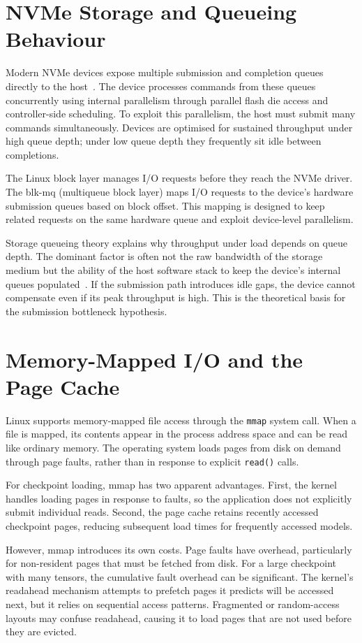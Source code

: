 \section{NVMe Storage and Queueing Behaviour}

Modern NVMe devices expose multiple submission and completion queues directly to the host~\cite{NVME_SPEC}. The device processes commands from these queues concurrently using internal parallelism through parallel flash die access and controller-side scheduling. To exploit this parallelism, the host must submit many commands simultaneously. Devices are optimised for sustained throughput under high queue depth; under low queue depth they frequently sit idle between completions.

The Linux block layer manages I/O requests before they reach the NVMe driver. The blk-mq (multiqueue block layer) maps I/O requests to the device's hardware submission queues based on block offset. This mapping is designed to keep related requests on the same hardware queue and exploit device-level parallelism.

Storage queueing theory explains why throughput under load depends on queue depth. The dominant factor is often not the raw bandwidth of the storage medium but the ability of the host software stack to keep the device's internal queues populated~\cite{STORAGE_QUEUEING}. If the submission path introduces idle gaps, the device cannot compensate even if its peak throughput is high. This is the theoretical basis for the submission bottleneck hypothesis.

\section{Memory-Mapped I/O and the Page Cache}

Linux supports memory-mapped file access through the \texttt{mmap} system call. When a file is mapped, its contents appear in the process address space and can be read like ordinary memory. The operating system loads pages from disk on demand through page faults, rather than in response to explicit \texttt{read()} calls.

For checkpoint loading, mmap has two apparent advantages. First, the kernel handles loading pages in response to faults, so the application does not explicitly submit individual reads. Second, the page cache retains recently accessed checkpoint pages, reducing subsequent load times for frequently accessed models.

However, mmap introduces its own costs. Page faults have overhead, particularly for non-resident pages that must be fetched from disk. For a large checkpoint with many tensors, the cumulative fault overhead can be significant. The kernel's readahead mechanism attempts to prefetch pages it predicts will be accessed next, but it relies on sequential access patterns. Fragmented or random-access layouts may confuse readahead, causing it to load pages that are not used before they are evicted.

